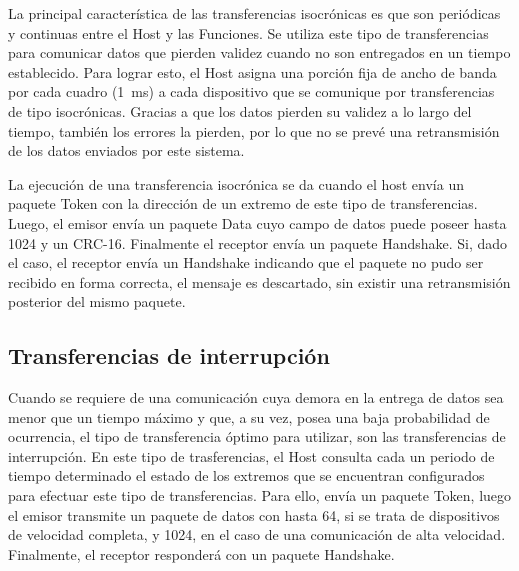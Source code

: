 	La principal característica de las transferencias isocrónicas es que son periódicas y continuas entre el Host y las Funciones. Se utiliza este tipo de transferencias para comunicar datos que pierden validez cuando no son entregados en un tiempo establecido. Para lograr esto, el Host asigna una porción fija de ancho de banda por cada cuadro (\SI{1}{\milli\second}) a cada dispositivo que se comunique por transferencias de tipo isocrónicas. Gracias a que los datos pierden su validez a lo largo del tiempo, también los errores la pierden, por lo que no se prevé una retransmisión de los datos enviados por este sistema.%
	
	La ejecución de una transferencia isocrónica se da cuando el host envía un paquete Token con la dirección de un extremo de este tipo de transferencias. Luego, el emisor envía un paquete Data cuyo campo de datos puede poseer hasta \SI{1024}{\byte} y un CRC-16. Finalmente el receptor envía un paquete Handshake. Si, dado el caso, el receptor envía un Handshake indicando que el paquete no pudo ser recibido en forma correcta, el mensaje es descartado, sin existir una retransmisión posterior del mismo paquete.
	
\subsection{Transferencias de interrupción}
	Cuando se requiere de una comunicación cuya demora en la entrega de datos sea menor que un tiempo máximo y que, a su vez, posea una baja probabilidad de ocurrencia, el tipo de transferencia óptimo para utilizar, son las transferencias de interrupción. En este tipo de trasferencias, el Host consulta cada un periodo de tiempo determinado el estado de los extremos que se encuentran configurados para efectuar este tipo de transferencias. Para ello, envía un paquete Token, luego el emisor transmite un paquete de datos con hasta \SI{64}{\byte}, si se trata de dispositivos de velocidad completa, y \SI{1024}{\byte}, en el caso de una comunicación de alta velocidad. Finalmente, el receptor responderá con un paquete Handshake.
